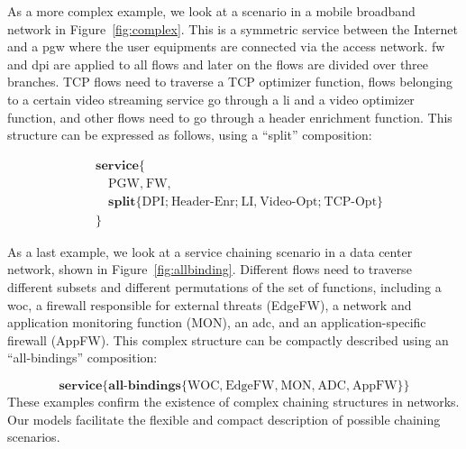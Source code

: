 \documentclass{sig-alternate-per}
\begin{document}
As a more complex example, we look at a scenario in a mobile broadband network in
Figure~\ref{fig:complex}.
This is a symmetric service between the Internet and a \ac{pgw} where the user
equipments are connected via the access network. \ac{fw} and \ac{dpi} are
applied to all flows and later on the flows are divided over three branches. 
TCP flows need to traverse a TCP optimizer function, flows belonging to a 
certain video streaming service go through a \ac{li} and a video optimizer function,
and other flows need to go through a header enrichment function. This structure 
can be expressed as follows, using a ``split'' composition:

{\scriptsize
\vspace{-8pt}
\begin{align*}
& \textbf{service} \textbf{\{} \\ 
& \quad \text{PGW} \textbf{,} ~\text{FW} \textbf{,} \\
& \quad\textbf{split} \textbf{\{} \text{DPI} \textbf{;} ~\text{Header-Enr} \textbf{;} ~\text{LI} \textbf{,} ~\text{Video-Opt} \textbf{;} ~\text{TCP-Opt} \textbf{\}} \\
& \textbf{\}}
\end{align*}
}

As a last example, we look at a service chaining scenario in a data center network,
shown in Figure~\ref{fig:allbinding}. Different flows need to traverse different
subsets and different permutations of the set of functions, including a \ac{woc},
a firewall responsible for external threats (EdgeFW), a network and application 
monitoring function (MON), an \ac{adc}, and an application-specific firewall
(AppFW). This complex structure can be compactly described using an ``all-bindings''
composition:

{\scriptsize
\vspace{-8pt}
\begin{equation*}
\textbf{service} \textbf{\{} \textbf{all-bindings} \textbf{\{} \text{WOC} \textbf{,} ~\text{EdgeFW} \textbf{,} ~\text{MON} \textbf{,} ~\text{ADC} \textbf{,} ~\text{AppFW} \textbf{\}} \textbf{\}} 
\end{equation*}
}
These examples confirm the existence of complex chaining structures in
networks. Our models facilitate the flexible and compact description of possible 
chaining scenarios.
\end{document}
